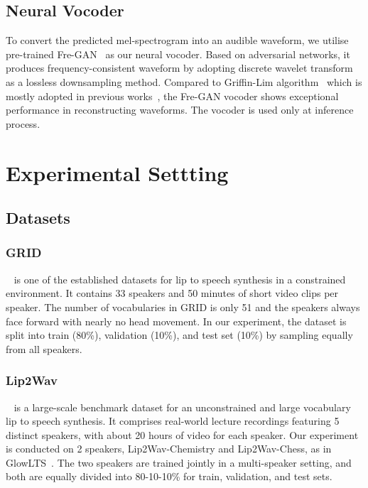 \documentclass[letterpaper]{article} %
\begin{document}
\subsection{Neural Vocoder}
To convert the predicted mel-spectrogram into an audible waveform, we utilise pre-trained Fre-GAN~\cite{kim21f_interspeech} as our neural vocoder. Based on adversarial networks, it produces frequency-consistent waveform by adopting discrete wavelet transform~\cite{daubechies1988orthonormal} as a lossless downsampling method. Compared to Griffin-Lim algorithm~\cite{griffin1984signal} which is mostly adopted in previous works~\cite{kim2021lip,he2022flow,kim2023lip}, the Fre-GAN vocoder shows exceptional performance in reconstructing waveforms.
The vocoder is used only at inference process.


\section{Experimental Settting}
\subsection{Datasets}
\subsubsection{GRID}~\cite{cooke2006audio} is one of the established datasets for lip to speech synthesis in a constrained environment.
It contains 33 speakers and 50 minutes of short video clips per speaker.
The number of vocabularies in GRID is only 51 and the speakers always face forward with nearly no head movement.
In our experiment, the dataset is split into train (80\%), validation (10\%), and test set (10\%) by sampling equally from all speakers.

\subsubsection{Lip2Wav}~\cite{prajwal2020learning} is a large-scale benchmark dataset for an unconstrained and large vocabulary lip to speech synthesis. It comprises real-world lecture recordings featuring 5 distinct speakers, with about 20 hours of video for each speaker. Our experiment is conducted on 2 speakers, Lip2Wav-Chemistry and Lip2Wav-Chess, as in GlowLTS~\cite{he2022flow}. The two speakers are trained jointly in a multi-speaker setting, and both are equally divided into 80-10-10\% for train, validation, and test sets.
\end{document}
